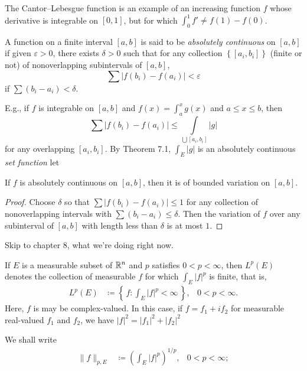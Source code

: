 The Cantor--Lebesgue function is an example of an increasing function $f$
whose derivative is integrable on $[0,1]$, but for which $\int_0^1 f'\neq
f(1)-f(0)$.

A function on a finite interval $[a,b]$ is said to be \emph{absolutely
  continuous} on $[a,b]$ if given $\varepsilon>0$, there exists $\delta>0$
such that for any collection $\left\{{[a_i,b_i]}\right\}$ (finite or not)
of nonoverlapping subintervals of $[a,b]$,
\[
\sum\left|f(b_i)-f(a_i)\right|<\varepsilon
\]
if $\sum(b_i-a_i)<\delta$.

E.g., if $f$ is integrable on $[a,b]$ and $f(x)=\int_a^x g(x)$ and $a\leq
x\leq b$, then
\[
\sum\left|f(b_i)-f(a_i)\right|\leq\int\limits_{\bigcup[a_i,b_i]}|g|
\]
for any overlapping $[a_i,b_i]$. By Theorem 7.1, $\int_E |g|$ is an
absolutely continuous \emph{set function} let

\begin{theorem}[7.27]
If $f$ is absolutely continuous on $[a,b]$, then it is of bounded variation
on $[a,b]$.
\end{theorem}
\begin{proof}
Choose $\delta$ so that $\sum |f(b_i)-f(a_i)|\leq 1$ for any collection of
nonoverlapping intervals with $\sum(b_i-a_i)\leq\delta$. Then the variation
of $f$ over any subinterval of $[a,b]$ with length less than $\delta$ is at
most $1$.
\end{proof}

\bigskip

Skip to chapter 8, what we're doing right now.

If $E$ is a measurable subset of $\mathbb{R}^n$ and $p$ satisfies $0<p<\infty$,
then $L^p(E)$ denotes the collection of measurable $f$ for which
$\int_E|f|^p$ is finite, that is,
\[
\begin{aligned}
L^p(E)&\coloneqq\left\{\,f:\int_E|f|^p<\infty\, \right\},&0<p<\infty.
\end{aligned}
\]
Here, $f$ is may be complex-valued. In this case, if $f=f_1+if_2$ for
measurable real-valued $f_1$ and $f_2$, we have $|f|^2=|f_1|^2+|f_2|^2$

We shall write
\[
\begin{aligned}
\|f\|_{p,E}&\coloneqq\left(\int_E|f|^p\right)^{1/p},&0<p<\infty;
\end{aligned}
\]

